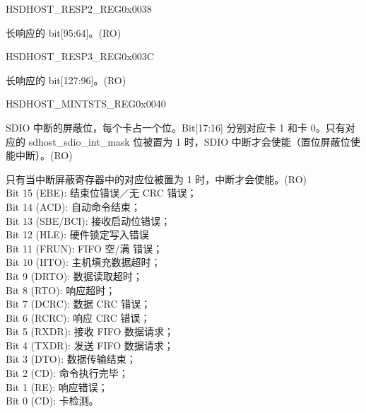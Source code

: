 \begin{register}{H}{SDHOST\_RESP2\_REG}{0x{}0038}\label{regdesc:RESP2REG}
%
\regnewline%
\begin{regdesc}\begin{reglist}
\item [SDHOST\_RESP2\_REG] 长响应的 bit[95:64]。(RO)
\end{reglist}\end{regdesc}
\end{register}


\begin{register}{H}{SDHOST\_RESP3\_REG}{0x{}003C}\label{regdesc:RESP3REG}
%
\regnewline%
\begin{regdesc}\begin{reglist}
\item [SDHOST\_RESP3\_REG] 长响应的 bit[127:96]。(RO)
\end{reglist}\end{regdesc}
\end{register}


\begin{register}{H}{SDHOST\_MINTSTS\_REG}{0x{}0040}\label{regdesc:MINTSTSREG}
%
%
%
\regnewline%
\begin{regdesc}\begin{reglist}
\item [SDHOST\_SDIO\_INTERRUPT\_MSK]SDIO 中断的屏蔽位，每个卡占一个位。Bit[17:16] 分别对应卡 1 和卡 0。只有对应的 sdhost\_sdio\_int\_mask 位被置为 1 时，SDIO 中断才会使能（置位屏蔽位使能中断）。(RO)
\item [SDHOST\_INT\_STATUS\_MSK] 只有当中断屏蔽寄存器中的对应位被置为 1 时，中断才会使能。(RO)\\
Bit 15 (EBE): 结束位错误／无 CRC 错误；\\
Bit 14 (ACD): 自动命令结束；\\
Bit 13 (SBE/BCI): 接收启动位错误；\\
Bit 12 (HLE): 硬件锁定写入错误\\
Bit 11 (FRUN): FIFO 空/满 错误；\\
Bit 10 (HTO): 主机填充数据超时；\\
Bit 9 (DRTO): 数据读取超时；\\
Bit 8 (RTO): 响应超时； \\
Bit 7 (DCRC): 数据 CRC 错误； \\
Bit 6 (RCRC): 响应 CRC 错误； \\
Bit 5 (RXDR): 接收 FIFO 数据请求； \\
Bit 4 (TXDR): 发送 FIFO 数据请求； \\
Bit 3 (DTO): 数据传输结束； \\
Bit 2 (CD): 命令执行完毕； \\
Bit 1 (RE): 响应错误；\\
Bit 0 (CD): 卡检测。
\end{reglist}\end{regdesc}
\end{register}


